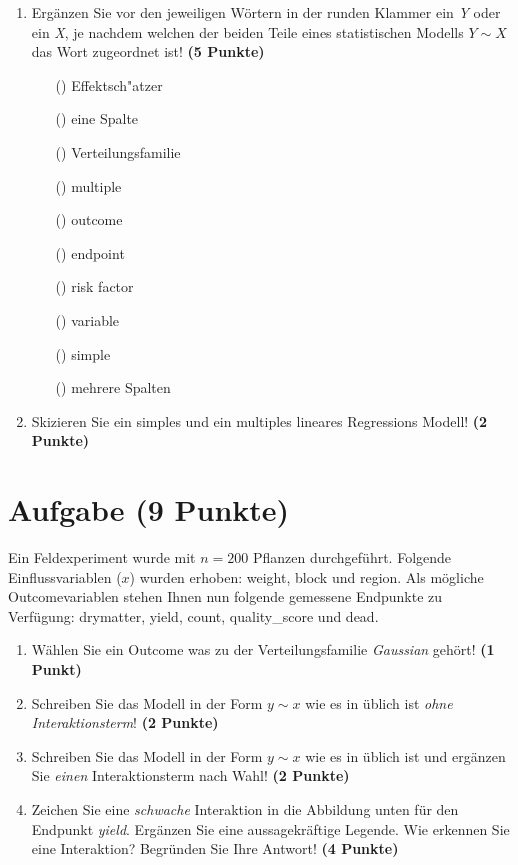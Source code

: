 \documentclass[a4paper, 10pt]{scrartcl}\usepackage[]{graphicx}\usepackage[]{xcolor}
\begin{document}
\begin{enumerate}
\item Erg{\"a}nzen Sie vor den jeweiligen W{\"o}rtern in der runden Klammer ein
  \textit{Y} oder ein \textit{X}, je nachdem welchen der beiden Teile eines
   statistischen Modells $Y \sim X$ das Wort zugeordnet ist! \textbf{(5 Punkte)}
  \begin{itemize}
  \item [(\phantom{xx})] Effektsch{"a}tzer
  \item [(\phantom{xx})] eine Spalte
  \item [(\phantom{xx})] Verteilungsfamilie
  \item [(\phantom{xx})] multiple
  \item [(\phantom{xx})] outcome
  \item [(\phantom{xx})] endpoint
  \item [(\phantom{xx})] risk factor
  \item [(\phantom{xx})] variable
  \item [(\phantom{xx})] simple
  \item [(\phantom{xx})] mehrere Spalten
  \end{itemize} 
\item Skizieren Sie ein simples und ein multiples lineares Regressions
  Modell! \textbf{(2 Punkte)} 
\end{enumerate}
 
\clearpage

\section{Aufgabe \hfill (9 Punkte)}



Ein Feldexperiment wurde mit $n = 200$ Pflanzen durchgef{\"u}hrt. Folgende
Einflussvariablen ($x$) wurden erhoben: weight, block und region. Als m{\"o}gliche Outcomevariablen stehen Ihnen nun
folgende gemessene Endpunkte zu Verf{\"u}gung: drymatter, yield, count, quality\_score und dead.

\begin{enumerate}
\item W{\"a}hlen Sie ein Outcome was zu der Verteilungsfamilie
  \textit{Gaussian} geh{\"o}rt! \textbf{(1 Punkt)}
\item Schreiben Sie das Modell in der Form $y \sim x$ wie es in \Rlogo
  {\"u}blich ist \textit{ohne Interaktionsterm}! \textbf{(2 Punkte)}
\item Schreiben Sie das Modell in der Form $y \sim x$ wie es in \Rlogo
  {\"u}blich ist und erg{\"a}nzen Sie \textit{einen} Interaktionsterm nach Wahl! \textbf{(2 Punkte)} 
\item Zeichen Sie eine \textit{schwache}
  Interaktion in die Abbildung unten f{\"u}r den Endpunkt
  \textit{yield}. Erg{\"a}nzen Sie eine aussagekr{\"a}ftige Legende. Wie erkennen
  Sie eine Interaktion? Begr{\"u}nden Sie Ihre Antwort! \textbf{(4 Punkte)}
\end{enumerate}
\end{document}
